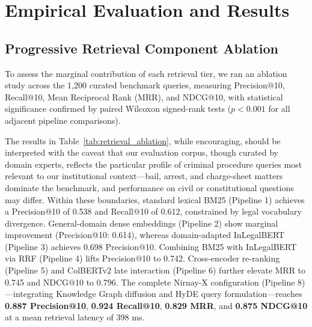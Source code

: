 \documentclass[conference]{IEEEtran}
\begin{document}
\section{Empirical Evaluation and Results}

\subsection{Progressive Retrieval Component Ablation}
To assess the marginal contribution of each retrieval tier, we ran an ablation study across the 1,200 curated benchmark queries, measuring Precision@10, Recall@10, Mean Reciprocal Rank (MRR), and NDCG@10, with statistical significance confirmed by paired Wilcoxon signed-rank tests ($p < 0.001$ for all adjacent pipeline comparisons).

The results in Table~\ref{tab:retrieval_ablation}, while encouraging, should be interpreted with the caveat that our evaluation corpus, though curated by domain experts, reflects the particular profile of criminal procedure queries most relevant to our institutional context---bail, arrest, and charge-sheet matters dominate the benchmark, and performance on civil or constitutional questions may differ. Within these boundaries, standard lexical BM25 (Pipeline 1) achieves a Precision@10 of 0.538 and Recall@10 of 0.612, constrained by legal vocabulary divergence. General-domain dense embeddings (Pipeline 2) show marginal improvement (Precision@10: 0.614), whereas domain-adapted InLegalBERT (Pipeline 3) achieves 0.698 Precision@10. Combining BM25 with InLegalBERT via RRF (Pipeline 4) lifts Precision@10 to 0.742. Cross-encoder re-ranking (Pipeline 5) and ColBERTv2 late interaction (Pipeline 6) further elevate MRR to 0.745 and NDCG@10 to 0.796. The complete Nirnay-X configuration (Pipeline 8)---integrating Knowledge Graph diffusion and HyDE query formulation---reaches \textbf{0.887 Precision@10}, \textbf{0.924 Recall@10}, \textbf{0.829 MRR}, and \textbf{0.875 NDCG@10} at a mean retrieval latency of 398 ms.
\end{document}
